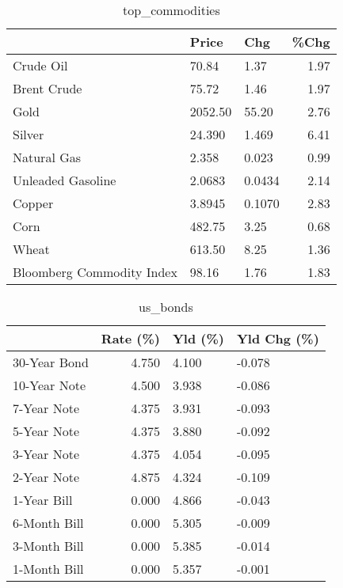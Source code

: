 \documentclass{article}%
\begin{document}
\begin{table}[htbp]%
\caption{top\_commodities}%
\centering%
\begin{adjustbox}{width=1\textwidth}%
\begin{tabular}{lllr}
\toprule
                          &   Price &    Chg &  \%Chg \\
\midrule
               Crude Oil  &   70.84 &   1.37 &  1.97 \\
             Brent Crude  &   75.72 &   1.46 &  1.97 \\
                    Gold  & 2052.50 &  55.20 &  2.76 \\
                  Silver  &  24.390 &  1.469 &  6.41 \\
             Natural Gas  &   2.358 &  0.023 &  0.99 \\
       Unleaded Gasoline  &  2.0683 & 0.0434 &  2.14 \\
                  Copper  &  3.8945 & 0.1070 &  2.83 \\
                    Corn  &  482.75 &   3.25 &  0.68 \\
                   Wheat  &  613.50 &   8.25 &  1.36 \\
Bloomberg Commodity Index &   98.16 &   1.76 &  1.83 \\
\bottomrule
\end{tabular}
%
\end{adjustbox}%
\end{table}

%


\begin{table}[htbp]%
\caption{us\_bonds}%
\centering%
\begin{adjustbox}{width=1\textwidth}%
\begin{tabular}{lrll}
\toprule
             &  Rate (\%) & Yld (\%) & Yld Chg (\%) \\
\midrule
30-Year Bond &     4.750 &   4.100 &      -0.078 \\
10-Year Note &     4.500 &   3.938 &      -0.086 \\
 7-Year Note &     4.375 &   3.931 &      -0.093 \\
 5-Year Note &     4.375 &   3.880 &      -0.092 \\
 3-Year Note &     4.375 &   4.054 &      -0.095 \\
 2-Year Note &     4.875 &   4.324 &      -0.109 \\
 1-Year Bill &     0.000 &   4.866 &      -0.043 \\
6-Month Bill &     0.000 &   5.305 &      -0.009 \\
3-Month Bill &     0.000 &   5.385 &      -0.014 \\
1-Month Bill &     0.000 &   5.357 &      -0.001 \\
\bottomrule
\end{tabular}
%
\end{adjustbox}%
\end{table}
\end{document}

